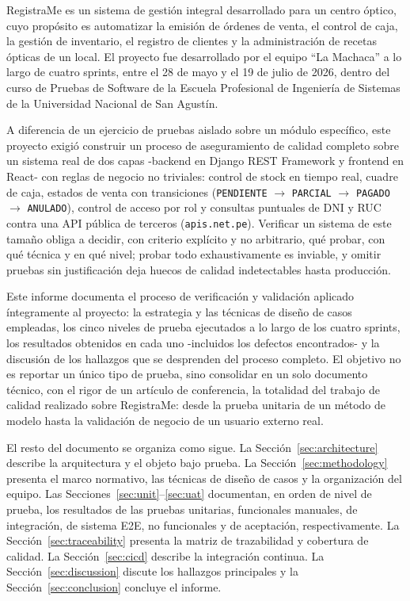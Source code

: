 \documentclass[conference]{IEEEtran}
\begin{document}
RegistraMe es un sistema de gestión integral desarrollado para un centro óptico, cuyo propósito es automatizar la emisión de órdenes de venta, el control de caja, la gestión de inventario, el registro de clientes y la administración de recetas ópticas de un local. El proyecto fue desarrollado por el equipo ``La Machaca'' a lo largo de cuatro sprints, entre el 28 de mayo y el 19 de julio de 2026, dentro del curso de Pruebas de Software de la Escuela Profesional de Ingeniería de Sistemas de la Universidad Nacional de San Agustín.

A diferencia de un ejercicio de pruebas aislado sobre un módulo específico, este proyecto exigió construir un proceso de aseguramiento de calidad completo sobre un sistema real de dos capas -backend en Django REST Framework y frontend en React- con reglas de negocio no triviales: control de stock en tiempo real, cuadre de caja, estados de venta con transiciones (\texttt{PENDIENTE} $\rightarrow$ \texttt{PARCIAL} $\rightarrow$ \texttt{PAGADO} $\rightarrow$ \texttt{ANULADO}), control de acceso por rol y consultas puntuales de DNI y RUC contra una API pública de terceros (\texttt{apis.net.pe}). Verificar un sistema de este tamaño obliga a decidir, con criterio explícito y no arbitrario, qué probar, con qué técnica y en qué nivel; probar todo exhaustivamente es inviable, y omitir pruebas sin justificación deja huecos de calidad indetectables hasta producción.

Este informe documenta el proceso de verificación y validación aplicado íntegramente al proyecto: la estrategia y las técnicas de diseño de casos empleadas, los cinco niveles de prueba ejecutados a lo largo de los cuatro sprints, los resultados obtenidos en cada uno -incluidos los defectos encontrados- y la discusión de los hallazgos que se desprenden del proceso completo. El objetivo no es reportar un único tipo de prueba, sino consolidar en un solo documento técnico, con el rigor de un artículo de conferencia, la totalidad del trabajo de calidad realizado sobre RegistraMe: desde la prueba unitaria de un método de modelo hasta la validación de negocio de un usuario externo real.

El resto del documento se organiza como sigue. La Sección~\ref{sec:architecture} describe la arquitectura y el objeto bajo prueba. La Sección~\ref{sec:methodology} presenta el marco normativo, las técnicas de diseño de casos y la organización del equipo. Las Secciones~\ref{sec:unit}--\ref{sec:uat} documentan, en orden de nivel de prueba, los resultados de las pruebas unitarias, funcionales manuales, de integración, de sistema E2E, no funcionales y de aceptación, respectivamente. La Sección~\ref{sec:traceability} presenta la matriz de trazabilidad y cobertura de calidad. La Sección~\ref{sec:cicd} describe la integración continua. La Sección~\ref{sec:discussion} discute los hallazgos principales y la Sección~\ref{sec:conclusion} concluye el informe.
\end{document}
